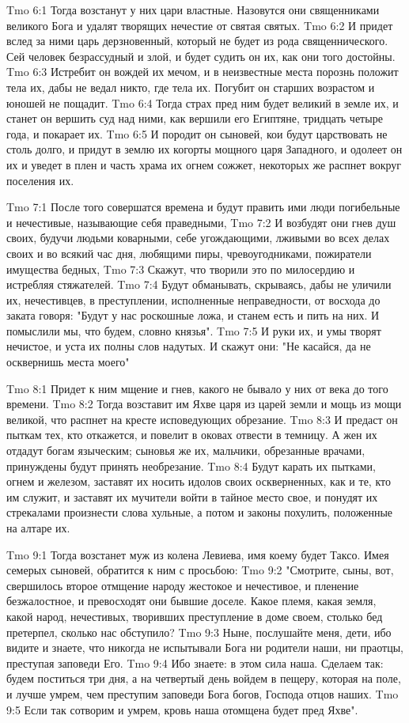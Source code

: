 \vs Tmo 6:1
Тогда возстанут у них цари властные. Назовутся они священниками великого Бога и удалят творящих нечестие от святая святых.
\vs Tmo 6:2
И придет вслед за ними царь дерзновенный, который не будет из рода священнического. Сей человек безрассудный и злой, и будет судить он их, как они того достойны.
\vs Tmo 6:3
Истребит он вождей их мечом, и в неизвестные места порознь положит тела их, дабы не ведал никто, где тела их. Погубит он старших возрастом и юношей не пощадит.
\vs Tmo 6:4
Тогда страх пред ним будет великий в земле их, и станет он вершить суд над ними, как вершили его Египтяне, тридцать четыре года, и покарает их.
\vs Tmo 6:5
И породит он сыновей, кои будут царствовать не столь долго, и придут в землю их когорты мощного царя Западного, и одолеет он их и уведет в плен и часть храма их огнем сожжет, некоторых же распнет вокруг поселения их.

\vs Tmo 7:1
После того совершатся времена и будут править ими люди погибельные и нечестивые, называющие себя праведными,
\vs Tmo 7:2
И возбудят они гнев душ своих, будучи людьми коварными, себе угождающими, лживыми во всех делах своих и во всякий час дня, любящими пиры, чревоугодниками, пожиратели имущества бедных,
\vs Tmo 7:3
Скажут, что творили это по милосердию и истребляя стяжателей.
\vs Tmo 7:4
Будут обманывать, скрываясь, дабы не уличили их, нечестивцев, в преступлении, исполненные неправедности, от восхода до заката говоря: "Будут у нас роскошные ложа, и станем есть и пить на них. И помыслили мы, что будем, словно князья".
\vs Tmo 7:5
И руки их, и умы творят нечистое, и уста их полны слов надутых. И скажут они: "Не касайся, да не осквернишь места моего"

\vs Tmo 8:1
Придет к ним мщение и гнев, какого не бывало у них от века до того времени.
\vs Tmo 8:2
Тогда возставит им Яхве царя из царей земли и мощь из мощи великой, что распнет на кресте исповедующих обрезание.
\vs Tmo 8:3
И предаст он пыткам тех, кто откажется, и повелит в оковах отвести в темницу. А жен их отдадут богам языческим; сыновья же их, мальчики, обрезанные врачами, принуждены будут принять необрезание.
\vs Tmo 8:4
Будут карать их пытками, огнем и железом, заставят их носить идолов своих оскверненных, как и те, кто им служит, и заставят их мучители войти в тайное место свое, и понудят их стрекалами произнести слова хульные, а потом и законы похулить, положенные на алтаре их.

\vs Tmo 9:1
Тогда возстанет муж из колена Левиева, имя коему будет Таксо. Имея семерых сыновей, обратится к ним с просьбою:
\vs Tmo 9:2
"Смотрите, сыны, вот, свершилось второе отмщение народу жестокое и нечестивое, и пленение безжалостное, и превосходят они бывшие доселе. Какое племя, какая земля, какой народ, нечестивых, творивших преступление в доме своем, столько бед претерпел, сколько нас обступило?
\vs Tmo 9:3
Ныне, послушайте меня, дети, ибо видите и знаете, что никогда не испытывали Бога ни родители наши, ни праотцы, преступая заповеди Его.
\vs Tmo 9:4
Ибо знаете: в этом сила наша. Сделаем так: будем поститься три дня, а на четвертый день войдем в пещеру, которая на поле, и лучше умрем, чем преступим заповеди Бога богов, Господа отцов наших.
\vs Tmo 9:5
Если так сотворим и умрем, кровь наша отомщена будет пред Яхве".

